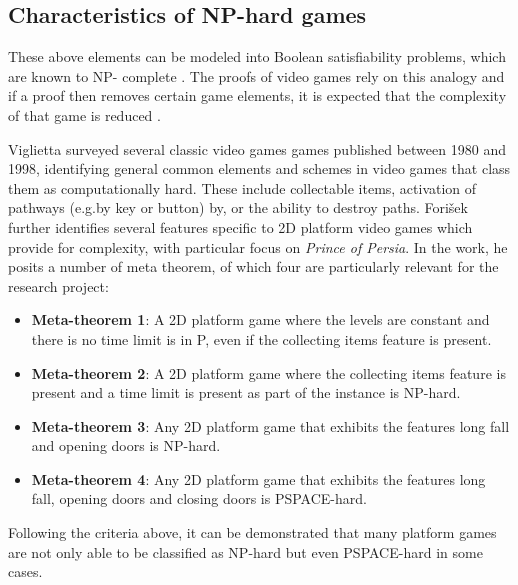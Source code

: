 \documentclass[11pt, a4paper, oneside]{report} %
\begin{document}
\subsection{Characteristics of NP-hard games}

These above elements can be modeled into Boolean satisfiability problems, which are known to NP-
complete \cite{DBLP:conf/fun/Forisek10, cook1971complexity}. The proofs of video games rely on this
analogy and if a proof then removes certain game elements, it is expected that the complexity of
that game is reduced \cite{viglietta2014gaming}.

Viglietta \cite{viglietta2014gaming} surveyed several classic video games games published between
1980 and 1998, identifying general common elements and schemes in video games that class them as
computationally hard. These include collectable items, activation of pathways (e.g.by key or button)
by, or the ability to destroy paths. Fori\v{s}ek \@\cite{DBLP:conf/fun/Forisek10} further
identifies several features specific to 2D platform video games which provide for complexity, with
particular focus on \textit{Prince of Persia}. In the work, he posits a number of meta theorem, of
which four are particularly relevant for the research project:

\begin{itemize}

  \item \textbf{Meta-theorem 1}: A 2D platform game where the levels are constant and there is no
                                time limit is in P, even if the collecting items feature is present.

  \item \textbf{Meta-theorem 2}: A 2D platform game where the collecting items feature is present
                                 and a time limit is present as part of the instance is NP-hard. 


  \item \textbf{Meta-theorem 3}: Any 2D platform game that exhibits the features long fall and
                                 opening doors is NP-hard. 


  \item \textbf{Meta-theorem 4}: Any 2D platform game that exhibits the features long fall, opening
                                 doors and closing doors is PSPACE-hard.

\end{itemize}


Following the criteria above, it can be demonstrated that many platform games are not only able to be
classified as NP-hard but even PSPACE-hard in some cases.
\end{document}

